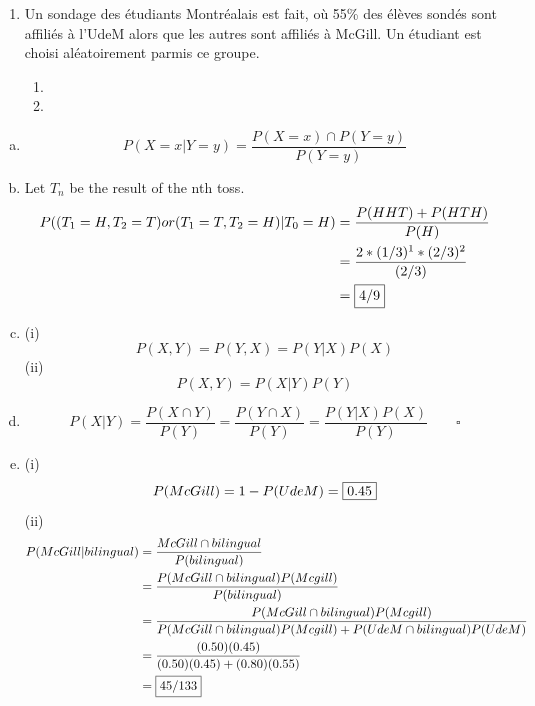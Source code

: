 \documentclass[11pt,french,english]{article}
\begin{document}
\begin{enumerate}
\begin{enumerate}
        \item {}
        {Un sondage des étudiants Montréalais est fait, où 55\% des élèves sondés sont affiliés à l'UdeM alors que les autres sont affiliés à McGill. Un étudiant est choisi aléatoirement parmis ce groupe.}
        \begin{enumerate}
            \item {}
            \item  {}
        \end{enumerate}
        
\end{enumerate}


\begin{enumerate}[(a)]
    \item $$P(X=x | Y=y) = \frac{P(X=x) \cap P(Y=y)}{P(Y=y)}$$
    \item Let $T_n$ be the result of the nth toss.
    \begin{align*}
        P((T_1 = H, T_2 = T) or (T_1 = T, T_2 = H)| T_0 = H) &= \frac{P(HHT) + P(HTH)}{P(H)} \\
        &= \frac{2*(1/3)^1*(2/3)^2}{(2/3)} \\
        &= \fbox{4/9}
    \end{align*}
    \item (i) $$P(X,Y) = P(Y,X) = P(Y|X)P(X)$$ (ii) $$P(X,Y) = P(X|Y)P(Y)$$
    \item $$P(X|Y) = \frac{P(X \cap Y)}{P(Y)} = \frac{P(Y \cap X)}{P(Y)} = \frac{P(Y|X)P(X)}{P(Y)} \qquad \square$$ 
    \item (i) $$P(McGill) = 1 - P(UdeM) = \fbox{0.45}$$ (ii) 
    \begin{align*}
        P(McGill | bilingual) &= \frac{McGill \cap bilingual}{P(bilingual)} \\
        &= \frac{P(McGill \cap bilingual)P(Mcgill)}{P(bilingual)} \\
        &= \frac{P(McGill \cap bilingual)P(Mcgill)}{P(McGill \cap bilingual)P(Mcgill) + P(UdeM \cap bilingual)P(UdeM)} \\
        &= \frac{(0.50)(0.45)}{(0.50)(0.45) + (0.80)(0.55)} \\
        &= \fbox{45/133}
    \end{align*}
\end{enumerate}


\end{enumerate}
\end{document}
